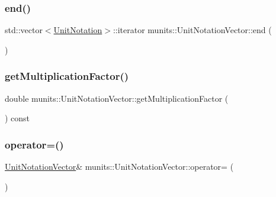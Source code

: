 \subsubsection{\texorpdfstring{end()}{end()}\hspace{0.1cm}{\footnotesize\ttfamily [2/2]}}
{\footnotesize\ttfamily std\+::vector$<$\hyperlink{classmunits_1_1_unit_notation}{Unit\+Notation}$>$\+::iterator munits\+::\+Unit\+Notation\+Vector\+::end (\begin{DoxyParamCaption}{ }\end{DoxyParamCaption})\hspace{0.3cm}{\ttfamily [inline]}}

\mbox{\label{classmunits_1_1_unit_notation_vector_a8494c2cb667af23b9f98a9aa2cf00244}} 
\subsubsection{\texorpdfstring{get\+Multiplication\+Factor()}{getMultiplicationFactor()}}
{\footnotesize\ttfamily double munits\+::\+Unit\+Notation\+Vector\+::get\+Multiplication\+Factor (\begin{DoxyParamCaption}{ }\end{DoxyParamCaption}) const\hspace{0.3cm}{\ttfamily [inline]}}

\mbox{\label{classmunits_1_1_unit_notation_vector_a9c5a6755c05092c2482596d8fddadf27}} 
\subsubsection{\texorpdfstring{operator=()}{operator=()}}
{\footnotesize\ttfamily \hyperlink{classmunits_1_1_unit_notation_vector}{Unit\+Notation\+Vector}\& munits\+::\+Unit\+Notation\+Vector\+::operator= (\begin{DoxyParamCaption}\item[{const \hyperlink{classmunits_1_1_unit_notation_vector}{Unit\+Notation\+Vector} \&}]{ }\end{DoxyParamCaption})\hspace{0.3cm}{\ttfamily [default]}}

